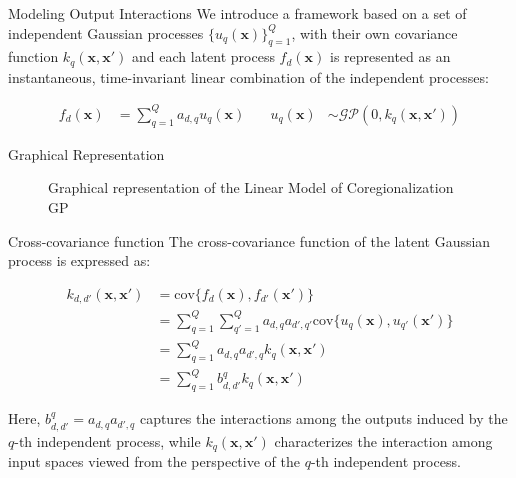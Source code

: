 \begin{frame}{Modeling Output Interactions}
	We introduce a framework based on a set of independent Gaussian processes $\{u_q(\mathbf{x})\}_{q=1}^Q$, with their own covariance function $k_q(\mathbf{x}, \mathbf{x}')$ and each latent process $f_d(\mathbf{x})$ is represented as an instantaneous, time-invariant linear combination of the independent processes:
	
	\begin{equation*}
		\begin{aligned}
			f_{d}(\mathbf{x}) &= \sum_{q=1}^Q a_{d,q} u_{q}(\mathbf{x}) \quad &
			u_{q}(\mathbf{x}) &\sim \mathcal{GP}(0, k_{q}(\mathbf{x}, \mathbf{x}')) 
		\end{aligned}\label{eq:LMC_cov}
	\end{equation*}
	

\end{frame}


\begin{frame}{Graphical Representation}
	\begin{figure}
	\setlength{} 
	\setlength{}
	
	\caption{Graphical representation of the Linear Model of Coregionalization GP} 
	\end{figure}

\end{frame}

\begin{frame}{Cross-covariance function}
	The cross-covariance function of the latent Gaussian process is expressed as:
	
	\begin{equation}
		\begin{split}
			k_{d,d'}(\mathbf{x}, \mathbf{x}') &= \text{cov}\{f_{d}(\mathbf{x}), f_{d'}(\mathbf{x}')\}\\
			&=\sum_{q=1}^Q \sum_{q'=1}^Q a_{d,q}a_{d',q'}\text{cov}\{u_{q}(\mathbf{x}), u_{q'}(\mathbf{x}')\}\\
			&=\sum_{q=1}^Q a_{d,q}a_{d',q} k_{q}(\mathbf{x}, \mathbf{x}')\\
			&=\sum_{q=1}^Q b^q_{d, d'} k_{q}(\mathbf{x}, \mathbf{x}')
		\end{split}
	\end{equation}
	
	Here, $b^q_{d, d'} = a_{d,q}a_{d',q}$ captures the interactions among the outputs induced by the $q$-th independent process, while $k_{q}(\mathbf{x}, \mathbf{x}')$ characterizes the interaction among input spaces viewed from the perspective of the $q$-th independent process. 
\end{frame}

